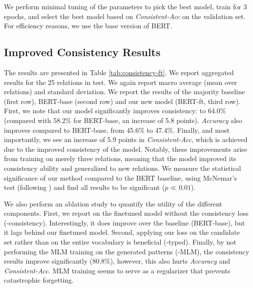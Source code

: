 We perform minimal tuning of the parameters to pick the best model, train for 3 epochs, and select the best model based on  \textit{Consistent-Acc} on the validation set.
For efficiency reasons, we use the base version of BERT.



\subsection{Improved Consistency Results}



The results are presented in Table
\ref{tab:consistency-ft}. We report aggregated results
for the 25 relations in test.
We again
report macro average (mean over relations) and
standard deviation.  We report the results of the majority
baseline (first row),   BERT-base  (second row)
and our new model (BERT-ft, third row).  First, we note
that our model significantly improves consistency:
to 64.0\%
(compared with 58.2\% for BERT-base,
an increase
of 5.8 points).  \textit{Accuracy} also improves compared to BERT-base, from 45.6\% to 47.4\%. Finally, and most
importantly, we see an increase of 5.9 points in
\textit{Consistent-Acc}, which is achieved due to the improved
consistency of the model.  Notably, these improvements
arise from training on merely three relations, meaning that
the model improved its consistency ability and generalized
to new relations.  We measure the statistical
significance of our method compared to the BERT baseline,
using McNemar's test (following
\citet{dror2018hitchhiker,dror2020statistical}) and find all
results to be significant ($p \ll 0.01$).


We also perform an ablation study to quantify the utility of
the different components. First, we report on the finetuned
model without the consistency loss
(-consistency). Interestingly, it does improve over the
baseline (BERT-base), but it lags behind our finetuned model.
Second, applying our loss on the candidate set rather than
on the entire vocabulary is beneficial (-typed). Finally, by
not performing the MLM training on the generated patterns
(-MLM), the consistency results improve significantly
(80.8\%), however, this also hurts  \textit{Accuracy} and \textit{Consistent-Acc}.
MLM training seems to serve as a regularizer
that prevents catastrophic forgetting.



